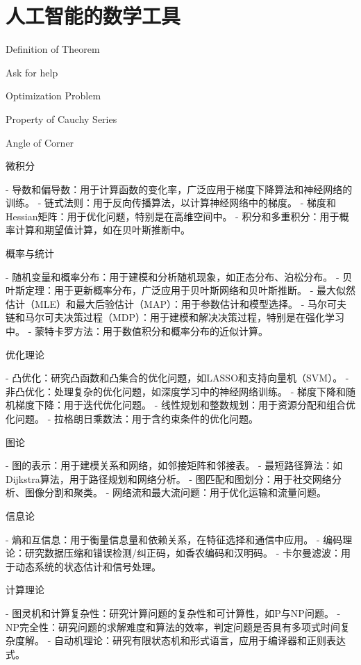 
\chapter{ 人工智能的数学工具}
 \begin{introduction}
  \item Definition of Theorem
  \item Ask for help
  \item Optimization Problem
  \item Property of Cauchy Series
  \item Angle of Corner
\end{introduction}


微积分

- 导数和偏导数：用于计算函数的变化率，广泛应用于梯度下降算法和神经网络的训练。
- 链式法则：用于反向传播算法，以计算神经网络中的梯度。
- 梯度和Hessian矩阵：用于优化问题，特别是在高维空间中。
- 积分和多重积分：用于概率计算和期望值计算，如在贝叶斯推断中。

概率与统计

- 随机变量和概率分布：用于建模和分析随机现象，如正态分布、泊松分布。
- 贝叶斯定理：用于更新概率分布，广泛应用于贝叶斯网络和贝叶斯推断。
- 最大似然估计（MLE）和最大后验估计（MAP）：用于参数估计和模型选择。
- 马尔可夫链和马尔可夫决策过程（MDP）：用于建模和解决决策过程，特别是在强化学习中。
- 蒙特卡罗方法：用于数值积分和概率分布的近似计算。

优化理论

- 凸优化：研究凸函数和凸集合的优化问题，如LASSO和支持向量机（SVM）。
- 非凸优化：处理复杂的优化问题，如深度学习中的神经网络训练。
- 梯度下降和随机梯度下降：用于迭代优化问题。
- 线性规划和整数规划：用于资源分配和组合优化问题。
- 拉格朗日乘数法：用于含约束条件的优化问题。

图论

- 图的表示：用于建模关系和网络，如邻接矩阵和邻接表。
- 最短路径算法：如Dijkstra算法，用于路径规划和网络分析。
- 图匹配和图划分：用于社交网络分析、图像分割和聚类。
- 网络流和最大流问题：用于优化运输和流量问题。

信息论

- 熵和互信息：用于衡量信息量和依赖关系，在特征选择和通信中应用。
- 编码理论：研究数据压缩和错误检测/纠正码，如香农编码和汉明码。
- 卡尔曼滤波：用于动态系统的状态估计和信号处理。

计算理论

- 图灵机和计算复杂性：研究计算问题的复杂性和可计算性，如P与NP问题。
- NP完全性：研究问题的求解难度和算法的效率，判定问题是否具有多项式时间复杂度解。
- 自动机理论：研究有限状态机和形式语言，应用于编译器和正则表达式。

